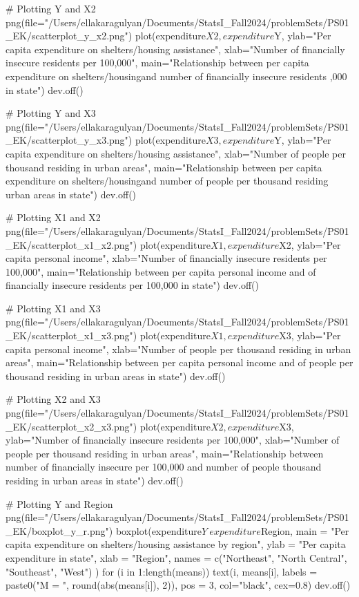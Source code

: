 # Plotting Y and X2
png(file="/Users/ellakaragulyan/Documents/StatsI_Fall2024/problemSets/PS01_EK/scatterplot_y_x2.png")
plot(expenditure$X2, expenditure$Y,
     ylab="Per capita expenditure on shelters/housing assistance",
     xlab="Number of financially insecure residents per 100,000",
     main="Relationship between per capita expenditure on shelters/housing\nassistance and number of financially insecure residents ,000 in state")
dev.off()

# Plotting Y and X3
png(file="/Users/ellakaragulyan/Documents/StatsI_Fall2024/problemSets/PS01_EK/scatterplot_y_x3.png")
plot(expenditure$X3, expenditure$Y,
     ylab="Per capita expenditure on shelters/housing assistance",
     xlab="Number of people per thousand residing in urban areas",
     main="Relationship between per capita expenditure on shelters/housing\nassistance and number of people per thousand residing \nin urban areas in state")
dev.off()

# Plotting X1 and X2
png(file="/Users/ellakaragulyan/Documents/StatsI_Fall2024/problemSets/PS01_EK/scatterplot_x1_x2.png")
plot(expenditure$X1, expenditure$X2,
     ylab="Per capita personal income",
     xlab="Number of financially insecure residents per 100,000",
     main="Relationship between per capita personal income and \nnumber of financially insecure residents per 100,000 in state")
dev.off()

# Plotting X1 and X3
png(file="/Users/ellakaragulyan/Documents/StatsI_Fall2024/problemSets/PS01_EK/scatterplot_x1_x3.png")
plot(expenditure$X1, expenditure$X3,
     ylab="Per capita personal income",
     xlab="Number of people per thousand residing in urban areas",
     main="Relationship between per capita personal income and \nnumber of people per thousand residing in urban areas in state")
dev.off()

# Plotting X2 and X3
png(file="/Users/ellakaragulyan/Documents/StatsI_Fall2024/problemSets/PS01_EK/scatterplot_x2_x3.png")
plot(expenditure$X2, expenditure$X3,
     ylab="Number of financially insecure residents per 100,000",
     xlab="Number of people per thousand residing in urban areas",
     main="Relationship between number of financially insecure \nresidents per 100,000 and number of people \nper thousand residing in urban areas in state")
dev.off()

# Plotting Y and Region
png(file="/Users/ellakaragulyan/Documents/StatsI_Fall2024/problemSets/PS01_EK/boxplot_y_r.png")
boxplot(expenditure$Y ~ expenditure$Region, 
	main = "Per capita expenditure on shelters/housing assistance by region",
	ylab = "Per capita expenditure in state",
	xlab = "Region",
	names = c("Northeast", "North Central", "Southeast", "West")  
)
for (i in 1:length(means)) {
	text(i, means[i], labels = paste0("M = ", round(abs(means[i]), 2)), pos = 3, col="black", cex=0.8)
}
dev.off()

